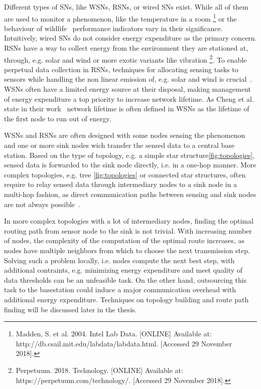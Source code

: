 Different types of \acp{SN}, like \acp{WSN}, \acp{RSN}, or wired \acp{SN}
exist. While all of them are used to monitor a phenomenon, like the temperature
in a room \footnote{Madden, S. et al. 2004. Intel Lab Data. [ONLINE] Available
at: http://db.csail.mit.edu/labdata/labdata.html. [Accessed 29 November 2018].}
or the behaviour of wildlife~\cite{bennett2011cranetracker} performance
indicators vary in their significance. Intuitively, wired \acp{SN} do not
consider energy expenditure as the primary concern. \acp{RSN} have a way to
collect energy from the environment they are stationed at, through, e.g. solar
and wind or more exotic variants like vibration \footnote{Perpetuum. 2018.
Technology. [ONLINE] Available at: https://perpetuum.com/technology/. [Accessed
29 November 2018].}. To enable perpetual data collection in \acp{RSN},
techniques for allocating sensing tasks to sensors while handling the non
linear emission of, e.g. solar and wind is crucial~\cite{liu2011perpetual}.
\acp{WSN} often have a limited energy source at their disposal, making
management of energy expenditure a top priority to increase network lifetime.
As Cheng et al. state in their work~\cite{cheng2013stcdg} network lifetime is
often defined in \acp{WSN} as the lifetime of the first node to run out of
energy. 
\par
\acp{WSN} and \acp{RSN} are often designed with some nodes sensing the
phenomenon and one or more sink nodes wich transfer the sensed data to a
central base station. Based on the type of topology, e.g. a simple star
structure\ref{fig:topologies}, sensed data is forwarded to the sink node
directly, i.e. in a one-hop manner. More complex topologies, e.g. tree
\ref{fig:topologies} or connected star structures, often require to relay
sensed data through intermediary nodes to a sink node in a multi-hop fashion,
as direct communication paths between sensing and sink nodes are not always
possible~\cite{romer2004design}. 
\par
In more complex topologies with a lot of intermediary nodes, finding the
optimal routing path from sensor node to the sink is not trivial. With
increasing number of nodes, the complexity of the computation of the optimal
route increases, as nodes have multiple neighbors from which to choose the next
transmission step. Solving such a problem locally, i.e. nodes compute the next
best step, with additional contraints, e.g. minimizing energy expenditure and
meet quality of data thresholds can be an unfeasible task. On the other hand,
outsourcing this task to the basestation could induce a major communication
overhead with additional energy expenditure. Techniques on topology building
and route path finding will be discussed later in the thesis.

